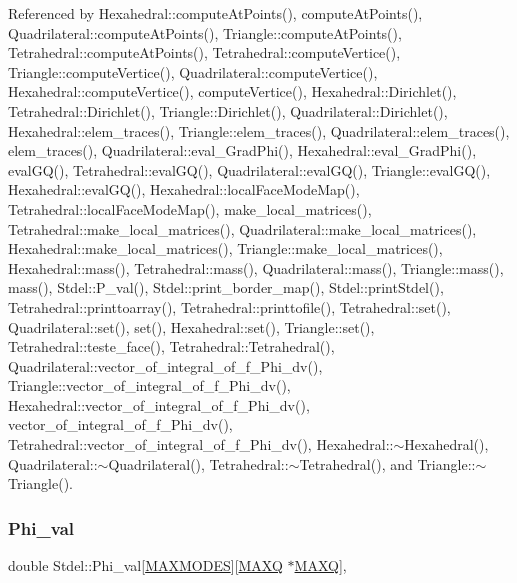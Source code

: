 Referenced by Hexahedral\+::compute\+At\+Points(), compute\+At\+Points(), Quadrilateral\+::compute\+At\+Points(), Triangle\+::compute\+At\+Points(), Tetrahedral\+::compute\+At\+Points(), Tetrahedral\+::compute\+Vertice(), Triangle\+::compute\+Vertice(), Quadrilateral\+::compute\+Vertice(), Hexahedral\+::compute\+Vertice(), compute\+Vertice(), Hexahedral\+::\+Dirichlet(), Tetrahedral\+::\+Dirichlet(), Triangle\+::\+Dirichlet(), Quadrilateral\+::\+Dirichlet(), Hexahedral\+::elem\+\_\+traces(), Triangle\+::elem\+\_\+traces(), Quadrilateral\+::elem\+\_\+traces(), elem\+\_\+traces(), Quadrilateral\+::eval\+\_\+\+Grad\+Phi(), Hexahedral\+::eval\+\_\+\+Grad\+Phi(), eval\+G\+Q(), Tetrahedral\+::eval\+G\+Q(), Quadrilateral\+::eval\+G\+Q(), Triangle\+::eval\+G\+Q(), Hexahedral\+::eval\+G\+Q(), Hexahedral\+::local\+Face\+Mode\+Map(), Tetrahedral\+::local\+Face\+Mode\+Map(), make\+\_\+local\+\_\+matrices(), Tetrahedral\+::make\+\_\+local\+\_\+matrices(), Quadrilateral\+::make\+\_\+local\+\_\+matrices(), Hexahedral\+::make\+\_\+local\+\_\+matrices(), Triangle\+::make\+\_\+local\+\_\+matrices(), Hexahedral\+::mass(), Tetrahedral\+::mass(), Quadrilateral\+::mass(), Triangle\+::mass(), mass(), Stdel\+::\+P\+\_\+val(), Stdel\+::print\+\_\+border\+\_\+map(), Stdel\+::print\+Stdel(), Tetrahedral\+::printtoarray(), Tetrahedral\+::printtofile(), Tetrahedral\+::set(), Quadrilateral\+::set(), set(), Hexahedral\+::set(), Triangle\+::set(), Tetrahedral\+::teste\+\_\+face(), Tetrahedral\+::\+Tetrahedral(), Quadrilateral\+::vector\+\_\+of\+\_\+integral\+\_\+of\+\_\+f\+\_\+\+Phi\+\_\+dv(), Triangle\+::vector\+\_\+of\+\_\+integral\+\_\+of\+\_\+f\+\_\+\+Phi\+\_\+dv(), Hexahedral\+::vector\+\_\+of\+\_\+integral\+\_\+of\+\_\+f\+\_\+\+Phi\+\_\+dv(), vector\+\_\+of\+\_\+integral\+\_\+of\+\_\+f\+\_\+\+Phi\+\_\+dv(), Tetrahedral\+::vector\+\_\+of\+\_\+integral\+\_\+of\+\_\+f\+\_\+\+Phi\+\_\+dv(), Hexahedral\+::$\sim$\+Hexahedral(), Quadrilateral\+::$\sim$\+Quadrilateral(), Tetrahedral\+::$\sim$\+Tetrahedral(), and Triangle\+::$\sim$\+Triangle().

\mbox{\label{classStdel_ab7849f154bd766857aac9557c19f7f84}} 
\subsubsection{\texorpdfstring{Phi\+\_\+val}{Phi\_val}}
{\footnotesize\ttfamily double Stdel\+::\+Phi\+\_\+val\mbox{[}\hyperlink{MyOptions_8h_aa75ccd382acf88cec3e9c8025c1f88b7}{M\+A\+X\+M\+O\+D\+ES}\mbox{]}\mbox{[}\hyperlink{MyOptions_8h_af708e94d886ba3f59582612949cac702}{M\+A\+XQ} $\ast$\hyperlink{MyOptions_8h_af708e94d886ba3f59582612949cac702}{M\+A\+XQ}\mbox{]}\hspace{0.3cm}{\ttfamily [protected]}, {\ttfamily [inherited]}}



